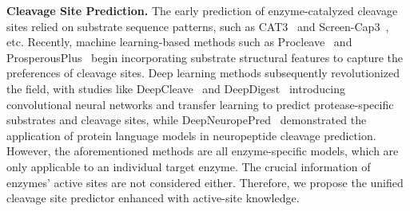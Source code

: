 \textbf{Cleavage Site Prediction.}
The early prediction of enzyme-catalyzed cleavage sites relied on substrate sequence patterns, such as CAT3~\cite{CAT3} and Screen-Cap3~\cite{ScreenCap3}, etc. Recently, machine learning-based methods such as Procleave~\cite{procleave} and ProsperousPlus~\cite{ProsperousPlus} begin incorporating substrate structural features to capture the preferences of cleavage sites. Deep learning methods subsequently revolutionized the field, with studies like DeepCleave~\cite{DeepCleave} and DeepDigest~\cite{yang2021deepdigest} introducing convolutional neural networks and transfer learning to predict protease-specific substrates and cleavage sites, while DeepNeuropePred~\cite{WANG2024309} demonstrated the application of protein language models in neuropeptide cleavage prediction. 
However, the aforementioned methods are all enzyme-specific models, which are only applicable to an individual target enzyme. The crucial information of enzymes' active sites are not considered either. Therefore, we propose the unified cleavage site predictor enhanced with active-site knowledge.




